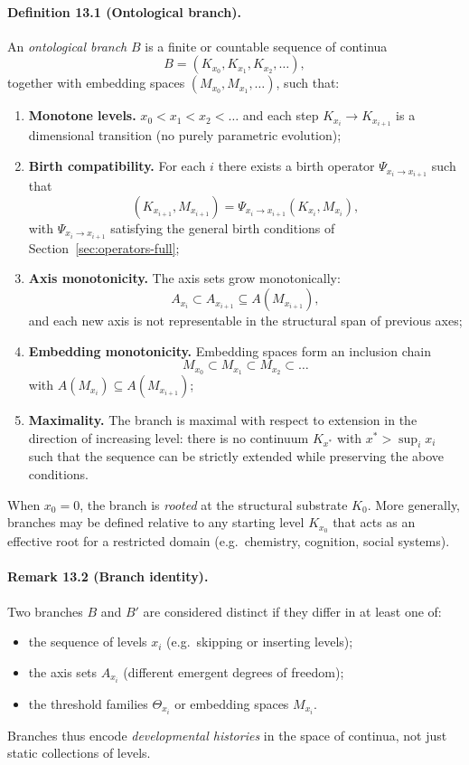 \paragraph{Definition 13.1 (Ontological branch).}
An \emph{ontological branch} \(B\) is a finite or countable sequence of continua
\[
  B = (K_{x_0}, K_{x_1}, K_{x_2}, \dots),
\]
together with embedding spaces \((M_{x_0}, M_{x_1}, \dots)\), such that:
\begin{enumerate}
  \item \textbf{Monotone levels.}\quad
        \(x_0 < x_1 < x_2 < \dots\) and each step
        \(K_{x_i} \to K_{x_{i+1}}\) is a dimensional transition
        (no purely parametric evolution);
  \item \textbf{Birth compatibility.}\quad
        For each \(i\) there exists a birth operator
        \(\Psi_{x_i\to x_{i+1}}\) such that
        \[
          (K_{x_{i+1}}, M_{x_{i+1}}) =
            \Psi_{x_i\to x_{i+1}}(K_{x_i}, M_{x_i}),
        \]
        with \(\Psi_{x_i\to x_{i+1}}\) satisfying the general birth
        conditions of Section~\ref{sec:operators-full};
  \item \textbf{Axis monotonicity.}\quad
        The axis sets grow monotonically:
        \[
          A_{x_i} \subset A_{x_{i+1}}
          \subseteq A(M_{x_{i+1}}),
        \]
        and each new axis is not representable in the structural span of
        previous axes;
  \item \textbf{Embedding monotonicity.}\quad
        Embedding spaces form an inclusion chain
        \[
          M_{x_0} \subset M_{x_1} \subset M_{x_2} \subset \dots
        \]
        with \(A(M_{x_i}) \subseteq A(M_{x_{i+1}})\);
  \item \textbf{Maximality.}\quad
        The branch is maximal with respect to extension in the direction
        of increasing level: there is no continuum \(K_{x^{\ast}}\) with
        \(x^{\ast} > \sup_i x_i\) such that the sequence can be strictly
        extended while preserving the above conditions.
\end{enumerate}

When \(x_0 = 0\), the branch is \emph{rooted} at the structural substrate
\(K_0\). More generally, branches may be defined relative to any starting level
\(K_{x_0}\) that acts as an effective root for a restricted domain
(e.g.\ chemistry, cognition, social systems).

\paragraph{Remark 13.2 (Branch identity).}
Two branches \(B\) and \(B'\) are considered distinct if they differ in at
least one of:
\begin{itemize}
  \item the sequence of levels \(x_i\) (e.g.\ skipping or inserting levels);
  \item the axis sets \(A_{x_i}\) (different emergent degrees of freedom);
  \item the threshold families \(\Theta_{x_i}\) or embedding spaces \(M_{x_i}\).
\end{itemize}
Branches thus encode \emph{developmental histories} in the space of continua,
not just static collections of levels.

